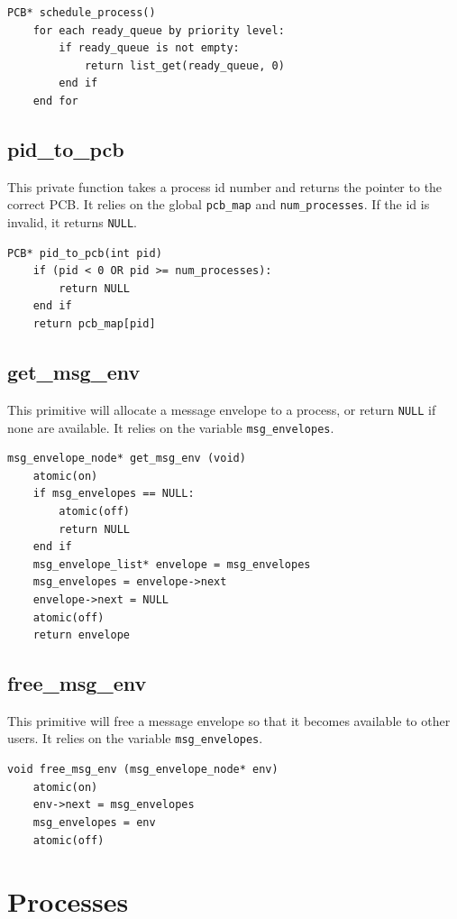 \documentclass[titlepage]{article}
\begin{document}
\begin{verbatim}
PCB* schedule_process()
    for each ready_queue by priority level:
        if ready_queue is not empty:
            return list_get(ready_queue, 0)
        end if
    end for
\end{verbatim}

\subsection{pid\_to\_pcb}
This private function takes a process id number and returns the pointer to the
correct PCB. It relies on the global \verb!pcb_map! and \verb!num_processes!. If
the id is invalid, it returns \verb!NULL!.

\begin{verbatim}
PCB* pid_to_pcb(int pid)
    if (pid < 0 OR pid >= num_processes):
        return NULL
    end if
    return pcb_map[pid]
\end{verbatim}

\subsection{get\_msg\_env}
This primitive will allocate a message envelope to a process, or return
\verb!NULL! if none are available.  It relies on the variable
\verb!msg_envelopes!.

\begin{verbatim}
msg_envelope_node* get_msg_env (void)
    atomic(on)
    if msg_envelopes == NULL:
        atomic(off)
        return NULL
    end if
    msg_envelope_list* envelope = msg_envelopes
    msg_envelopes = envelope->next
    envelope->next = NULL
    atomic(off)
    return envelope
\end{verbatim}

\subsection{free\_msg\_env}
This primitive will free a message envelope so that it becomes available to
other users.  It relies on the variable \verb!msg_envelopes!.

\begin{verbatim}
void free_msg_env (msg_envelope_node* env)
    atomic(on)
    env->next = msg_envelopes
    msg_envelopes = env
    atomic(off)
\end{verbatim}

\section{Processes}
\end{document}
